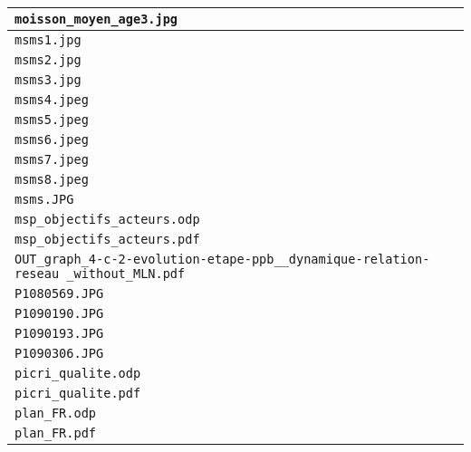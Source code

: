 \begin{center}
\begin{supertabular}{p{.8\textwidth}c}
\texttt{moisson\_moyen\_age3.jpg} & \cite{moisson_moyen_age3} \\ \hline

\texttt{msms1.jpg} & \cite{msms1} \\ \hline

\texttt{msms2.jpg} & \cite{msms2} \\ \hline

\texttt{msms3.jpg} & \cite{msms3} \\ \hline

\texttt{msms4.jpeg} & \cite{msms4} \\ \hline

\texttt{msms5.jpeg} & \cite{msms5} \\ \hline

\texttt{msms6.jpeg} & \cite{msms6} \\ \hline

\texttt{msms7.jpeg} & \cite{msms7} \\ \hline

\texttt{msms8.jpeg} & \cite{msms8} \\ \hline

\texttt{msms.JPG} & \cite{msms} \\ \hline

\texttt{msp\_objectifs\_acteurs.odp} & \cite{msp_objectifs_acteurs} \\
\texttt{msp\_objectifs\_acteurs.pdf} & \\ \hline

\texttt{OUT\_graph\_4-c-2-evolution-etape-ppb\_\_dynamique-relation-reseau
\_without\_MLN.pdf} & \cite{OUT_graph_4-c-2-evolution-etape-ppb__dynamique-relation-reseau_without_MLN} \\ \hline

\texttt{P1080569.JPG} & \cite{P1080569} \\ \hline

\texttt{P1090190.JPG} & \cite{P1090190} \\ \hline

\texttt{P1090193.JPG} & \cite{P1090193} \\ \hline

\texttt{P1090306.JPG} & \cite{P1090306} \\ \hline

\texttt{picri\_qualite.odp} & \cite{picri_qualite} \\ 
\texttt{picri\_qualite.pdf} & \\ \hline

\texttt{plan\_FR.odp} & \cite{plan_FR} \\
\texttt{plan\_FR.pdf} & \\ \hline


\end{supertabular}
\end{center}
